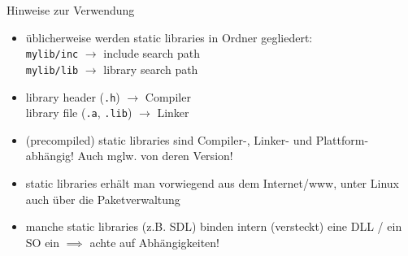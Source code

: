 \begin{frame}[fragile]{Hinweise zur Verwendung}
	\begin{itemize}[<+->]
		\item üblicherweise werden static libraries in Ordner gegliedert: \\
		\verb|mylib/inc| $\rightarrow$ include search path \\
		\verb|mylib/lib| $\rightarrow$ library search path
		\item library header (\verb|.h|) $\rightarrow$ Compiler \\
		library file (\verb|.a|, \verb|.lib|) $\rightarrow$ Linker
		\item (precompiled) static libraries sind Compiler-, Linker- und Plattform-abhängig! Auch mglw. von deren Version!
		\item static libraries erhält man vorwiegend aus dem Internet/www, unter Linux auch über die Paketverwaltung
		\item manche static libraries (z.B. SDL) binden intern (versteckt) eine DLL / ein SO ein $\implies$ achte auf Abhängigkeiten!
	\end{itemize}
\end{frame}



